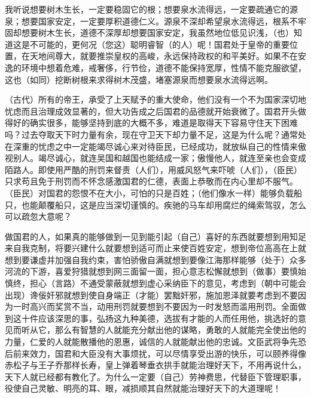 \documentclass[12pt,UTF-8,openany,a4]{ctexbook}
\begin{document}
\begin{large}\yiwen
    
    我听说想要树木生长，一定要稳固它的根；想要泉水流得远，一定要疏通它的源泉；想要国家安定，一定要厚积道德仁义。源泉不深却希望泉水流得远，根系不牢固却想要树木生长，道德不深厚却想要国家安定，我虽然地位低见识浅，（也）知道这是不可能的，更何况（您这）聪明睿智（的人）呢！国君处于皇帝的重要位置，在天地间尊大，就要推崇皇权的高峻，永远保持政权的和平美好。如果不在安逸的环境中想着危难，戒奢侈，行节俭，道德不能保持宽厚，性情不能克服欲望，这也（如同）挖断树根来求得树木茂盛，堵塞源泉而想要泉水流得远啊。
    
    （古代）所有的帝王，承受了上天赋予的重大使命，他们没有一个不为国家深切地忧虑而且治理成效显著的，但大功告成之后国君的品德就开始衰微了。国君开头做得好的确实很多，能够坚持到底的大概不多，难道是取得天下容易守住天下困难吗？过去夺取天下时力量有余，现在守卫天下却力量不足，这是为什么呢？通常处在深重的忧虑之中一定能竭尽诚心来对待臣民，已经成功，就放纵自己的性情来傲视别人。竭尽诚心，就连吴国和越国也能结成一家；傲慢他人，就连至亲也会变成陌路人。即使用严酷的刑罚来督责（人们），用威风怒气来吓唬（人们），（臣民）只求苟且免于刑罚而不怀念感激国君的仁德，表面上恭敬而在内心里却不服气。（臣民）对国君的怨恨不在大小，可怕的只是百姓；（他们像水一样）能够负载船只，也能颠覆船只，这是应当深切谨慎的。疾驰的马车却用腐烂的绳索驾驭，怎么可以疏忽大意呢？
    
    做国君的人，如果真的能够做到一见到能引起（自己）喜好的东西就要想到用知足来自我克制，将要兴建什么就要想到适可而止来使百姓安定，想到帝位高高在上就想到要谦虚并加强自我约束，害怕骄傲自满就想到要像江海那样能够（处于）众多河流的下游，喜爱狩猎就想到网三面留一面，担心意志松懈就想到（做事）要慎始慎终，担心（言路）不通受蒙蔽就想到虚心采纳臣下的意见，考虑到（朝中可能会出现）谗佞奸邪就想到使自身端正（才能）罢黜奸邪，施加恩泽就要考虑到不要因为一时高兴而奖赏不当，动用刑罚就要想到不要因为一时发怒而滥用刑罚。全面做到这十件应该深思的事，弘扬这九种美德，选拔有才能的人而任用他，挑选好的意见而听从它，那么有智慧的人就能充分献出他的谋略，勇敢的人就能完全使出他的力量，仁爱的人就能散播他的恩惠，诚信的人就能献出他的忠诚。文臣武将争先恐后前来效力，国君和大臣没有大事烦扰，可以尽情享受出游的快乐，可以颐养得像赤松子与王子乔那样长寿，皇上弹着琴垂衣拱手就能治理好天下，不用再说什么，天下人就已经都有教化了。为什么一定要（自己）劳神费思，代替臣下管理职事，役使自己灵敏、明亮的耳、眼，减损顺其自然就能治理好天下的大道理呢！
    

\end{large}


\newpage
\end{document}
